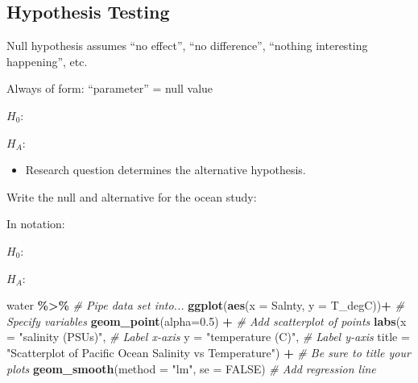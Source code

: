 \documentclass[
]{report}
\newenvironment{Shaded}{\begin{snugshade}}{\end{snugshade}}
\newcommand{\AttributeTok}[1]{\textcolor[rgb]{0.13,0.29,0.53}{#1}}
\newcommand{\CommentTok}[1]{\textcolor[rgb]{0.56,0.35,0.01}{\textit{#1}}}
\newcommand{\ConstantTok}[1]{\textcolor[rgb]{0.56,0.35,0.01}{#1}}
\newcommand{\FloatTok}[1]{\textcolor[rgb]{0.00,0.00,0.81}{#1}}
\newcommand{\FunctionTok}[1]{\textcolor[rgb]{0.13,0.29,0.53}{\textbf{#1}}}
\newcommand{\NormalTok}[1]{#1}
\newcommand{\SpecialCharTok}[1]{\textcolor[rgb]{0.81,0.36,0.00}{\textbf{#1}}}
\newcommand{\StringTok}[1]{\textcolor[rgb]{0.31,0.60,0.02}{#1}}
\providecommand{\tightlist}{%
  \setlength{\itemsep}{0pt}\setlength{\parskip}{0pt}}
\newcommand{\rgi}{\hspace{24pt}}  %
\begin{document}
\subsection*{Hypothesis Testing}\label{hypothesis-testing-9}

Null hypothesis assumes ``no effect'', ``no difference'', ``nothing interesting happening'', etc.

\rgi Always of form: ``parameter'' = null value

\(H_0:\)

\vspace{0.5in}

\(H_A:\)

\vspace{0.5in}

\begin{itemize}
\tightlist
\item
  Research question determines the alternative hypothesis.
\end{itemize}

Write the null and alternative for the ocean study:

In notation:

\(H_0:\)

\vspace{0.2in}

\(H_A:\)

\vspace{0.2in}

\begin{Shaded}
\begin{Highlighting}[]
\NormalTok{water }\SpecialCharTok{\%\textgreater{}\%} \CommentTok{\# Pipe data set into...}
\FunctionTok{ggplot}\NormalTok{(}\FunctionTok{aes}\NormalTok{(}\AttributeTok{x =}\NormalTok{ Salnty, }\AttributeTok{y =}\NormalTok{ T\_degC))}\SpecialCharTok{+}  \CommentTok{\# Specify variables}
  \FunctionTok{geom\_point}\NormalTok{(}\AttributeTok{alpha=}\FloatTok{0.5}\NormalTok{) }\SpecialCharTok{+}  \CommentTok{\# Add scatterplot of points}
  \FunctionTok{labs}\NormalTok{(}\AttributeTok{x =} \StringTok{"salinity (PSUs)"}\NormalTok{,  }\CommentTok{\# Label x{-}axis}
       \AttributeTok{y =} \StringTok{"temperature (C)"}\NormalTok{,  }\CommentTok{\# Label y{-}axis}
       \AttributeTok{title =} \StringTok{"Scatterplot of Pacific Ocean Salinity vs Temperature"}\NormalTok{) }\SpecialCharTok{+}
               \CommentTok{\# Be sure to title your plots}
  \FunctionTok{geom\_smooth}\NormalTok{(}\AttributeTok{method =} \StringTok{"lm"}\NormalTok{, }\AttributeTok{se =} \ConstantTok{FALSE}\NormalTok{)  }\CommentTok{\# Add regression line}
\end{Highlighting}
\end{Shaded}
\end{document}
